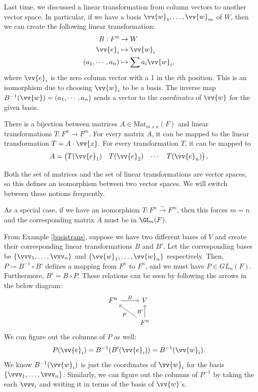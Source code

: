 \begin{example} \label{basistrans}
    Last time, we discussed a linear transformation from column vectors to another vector space. 
    In particular, if we have a basis $\vv{w}_1, \ldots, \vv{w}_m $ of $W$, then we can create the following linear transformation:
    \begin{align*}
        B: F^n &\rightarrow W \\
        \vv{e}_i & \mapsto \vv{w}_i \\
        (a_1, \cdots, a_n) &\mapsto \sum a_i \vv{w}_i,
    \end{align*}
    where $\vv{e}_i$ is the zero column vector with a 1 in the $i$th position.
    This is an isomorphism due to choosing $\vv{w}_i$ to be a basis. 
    The inverse map $B^{-1}(\vv{w}) = (a_1, \cdots, a_n)$ sends a vector to the \emph{coordinates} of $\vv{w}$ for the given basis.
\end{example}
\begin{example}
    There is a bijection between matrices $A \in \text{Mat}_{m\times n} (F)$ and linear transformations $T : F^n \rightarrow F^m$.
    For every matrix $A$, it can be mapped to the linear transformation $T = A\cdot \vv{x}$.
    For every transformation $T$, it can be mapped to 
    \[A = \begin{pmatrix} T(\vv{e}_1) & T(\vv{e}_2) &\cdots  & T(\vv{e}_n) \end{pmatrix}. \]

    Both the set of matrices and the set of linear transformations are vector spaces, so this defines an isomorphism between two vector spaces. We will switch between these notions frequently.

    As a special case, if we have an isomorphism $T : F^n \xrightarrow{\sim} F^m$, then this forces $m = n$ and the corresponding matrix $A$ must be in $\GL_n(F)$.
\end{example}
From Example \ref{basistrans}, suppose we have two different bases of $V$ and create their corresponding linear transformations $B$ and $B'$. Let the corresponding bases be $\{\vvv_1, \ldots, \vvv_n \}$ and $\{ \vv{w}_1, \ldots, \vv{w}_n \}$ respectively.
Then, $P \coloneqq B^{-1} \circ B'$ defines a mapping from $F^n$ to $F^n$, and we must have $P \in GL_n(F)$.
Furthermore, $B' = B \circ P$. These relations can be seen by following the arrows in the below diagram:
\[
\begin{tikzcd}
F^n \arrow[r, "B"] & V \\
& F^n \arrow[lu, "P"] \arrow[u, "B'"]
\end{tikzcd}
\]
We can figure out the columns of $P$ as well: 
\[P(\vv{e}_i) = B^{-1} (B'(\vv{e}_i)) = B^{-1}(\vv{w}_i).\]
We know $B^{-1}(\vv{w}_i)$ is just the coordinates of $\vv{w}_i$ for the basis $\{\vvv_1, \ldots, \vvv_n \}$. 
Similarly, we can figure out the columns of $P^{-1}$ by taking the each $\vvv_i$ and writing it in terms of the basis of $\vv{w}$'s.

